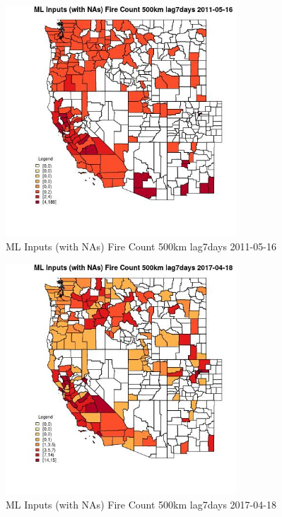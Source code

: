 \begin{figure} 
\centering  
\includegraphics[width=0.77\textwidth]{Code_Outputs/Report_ML_input_PM25_Step4_part_e_de_duplicated_aves_compiled_2019-05-21wNAs_CountyFire_Count_500km_lag7daysMean2011-05-16.jpg} 
\caption{\label{fig:Report_ML_input_PM25_Step4_part_e_de_duplicated_aves_compiled_2019-05-21wNAsCountyFire_Count_500km_lag7daysMean2011-05-16}ML Inputs (with NAs) Fire Count 500km lag7days 2011-05-16} 
\end{figure} 
 

\begin{figure} 
\centering  
\includegraphics[width=0.77\textwidth]{Code_Outputs/Report_ML_input_PM25_Step4_part_e_de_duplicated_aves_compiled_2019-05-21wNAs_CountyFire_Count_500km_lag7daysMean2017-04-18.jpg} 
\caption{\label{fig:Report_ML_input_PM25_Step4_part_e_de_duplicated_aves_compiled_2019-05-21wNAsCountyFire_Count_500km_lag7daysMean2017-04-18}ML Inputs (with NAs) Fire Count 500km lag7days 2017-04-18} 
\end{figure} 
 

